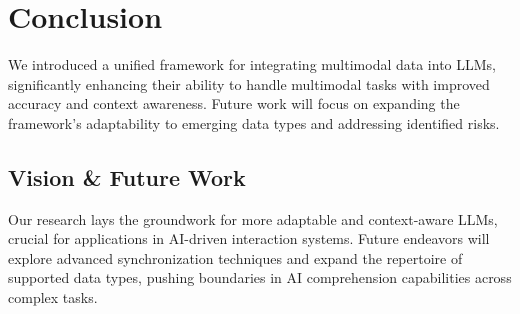\documentclass{article}
\begin{document}
\section{Conclusion}
We introduced a unified framework for integrating multimodal data into LLMs, significantly enhancing their ability to handle multimodal tasks with improved accuracy and context awareness. Future work will focus on expanding the framework's adaptability to emerging data types and addressing identified risks.

\subsection{Vision \& Future Work}
Our research lays the groundwork for more adaptable and context-aware LLMs, crucial for applications in AI-driven interaction systems. Future endeavors will explore advanced synchronization techniques and expand the repertoire of supported data types, pushing boundaries in AI comprehension capabilities across complex tasks.



\end{document}
